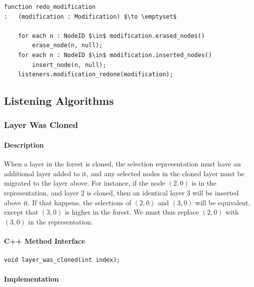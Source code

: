 \begin{lstlisting}[style=Default,backgroundcolor={\color[gray]{0.8}}]
function redo_modification
:	(modification : Modification) $\to \emptyset$

	for each n : NodeID $\in$ modification.erased_nodes()
		erase_node(n, null);
	for each n : NodeID $\in$ modification.inserted_nodes()
		insert_node(n, null);
	listeners.modification_redone(modification);
\end{lstlisting}

\newpage

\subsection{Listening Algorithms}

\subsubsection{Layer Was Cloned}


\paragraph{Description}

When a layer in the forest is cloned, the selection representation must have an additional layer added to it, and any selected nodes in the cloned layer must be migrated to the layer above. For instance, if the node $(2,0)$ is in the representation, and layer $2$ is cloned, then an identical layer $3$ will be inserted above it. If that happens, the selections of $(2,0)$ and $(3,0)$ will be equivalent, except that $(3,0)$ is higher in the forest. We must thus replace $(2,0)$ with $(3,0)$ in the representation.

\paragraph{C++ Method Interface}

\begin{lstlisting}[style=Prototype]
void layer_was_cloned(int index);
\end{lstlisting}

\paragraph{Implementation}

